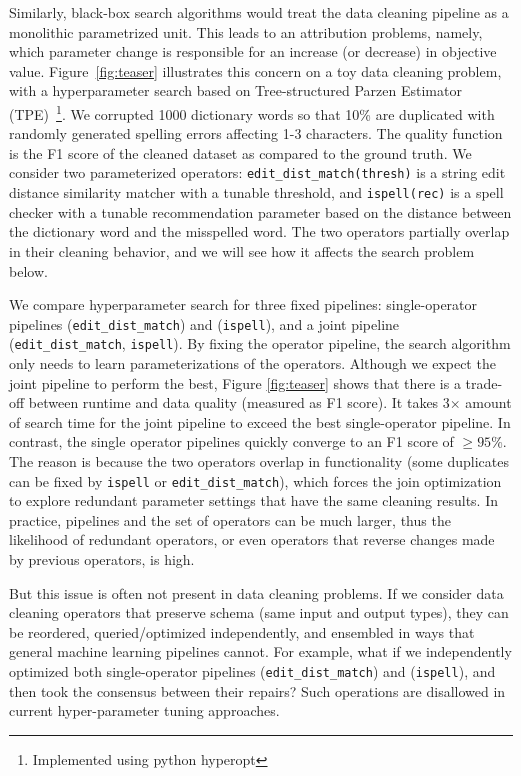  Similarly, black-box search algorithms would treat the data cleaning pipeline as a monolithic parametrized unit.
This leads to an attribution problems, namely, which parameter change is responsible for an increase (or decrease) in objective value.
Figure~\ref{fig:teaser} illustrates this concern on a toy data cleaning problem, with a hyperparameter search based on Tree-structured Parzen Estimator (TPE)~\cite{shahriari2016taking}\footnote{Implemented using \textsf{python hyperopt}}.  We corrupted 1000 dictionary words so that 10\% are duplicated with randomly generated spelling errors affecting 1-3 characters. The quality function is the F1 score of the cleaned dataset as compared to the ground truth.  We consider two parameterized operators: \texttt{edit\_dist\_match(thresh)} is a string edit distance similarity matcher with a tunable threshold, and \texttt{ispell(rec)} is a spell checker with a tunable recommendation parameter based on the distance between the dictionary word and the misspelled word.  The two operators partially overlap in their cleaning behavior, and we will see how it affects the search problem below.   

We compare hyperparameter search for three fixed pipelines:  single-operator pipelines (\texttt{edit\_dist\_match}) and (\texttt{ispell}), and a joint pipeline (\texttt{edit\_dist\_match}, \texttt{ispell}).  By fixing the operator pipeline, the search algorithm only needs to learn parameterizations of the operators.  Although we expect the joint pipeline to perform the best, Figure \ref{fig:teaser} shows that there is a trade-off between runtime and data quality (measured as F1 score).  It takes 3$\times$ amount of search time for the joint pipeline to exceed the best single-operator pipeline.    In contrast, the single operator pipelines quickly converge to an F1 score of $\ge95\%$.  The reason is because the two operators overlap in functionality (some duplicates can be fixed by \texttt{ispell} or \texttt{edit\_dist\_match}), which forces the join optimization to explore redundant parameter settings that have the same cleaning results.  In practice, pipelines and the set of operators can be much larger, thus the likelihood of redundant operators, or even operators that reverse changes made by previous operators, is high.

But this issue is often not present in data cleaning problems.
If we consider data cleaning operators that preserve schema (same input and output types), they can be reordered, queried/optimized independently, and ensembled in ways that general machine learning pipelines cannot.
For example, what if we independently optimized both single-operator pipelines (\texttt{edit\_dist\_match}) and (\texttt{ispell}), and then took the consensus between their repairs?
Such operations are disallowed in current hyper-parameter tuning approaches. 


